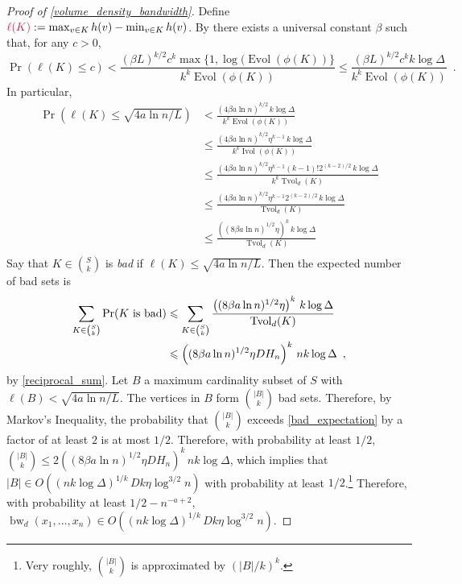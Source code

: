 \documentclass{patmorin}
\makeatletter
\renewcommand{\le}{\leqslant}
\newcommand{\david}[1]{{\color{orange} David: #1}}
\newcommand{\defin}[1]{\emph{\textcolor{brightmaroon}{#1}}}
\def\mathcolor#1#{\@mathcolor{#1}}
\def\@mathcolor#1#2#3{%
  \protect\leavevmode
  \begingroup
    \color#1{#2}#3%
  \endgroup
}
\newcommand{\mathdefin}[1]{\mathcolor{brightmaroon}{#1}}
\DeclareMathOperator{\bw}{bw}
\DeclareMathOperator{\evol}{Evol}
\DeclareMathOperator{\ivol}{Ivol}
\DeclareMathOperator{\tvol}{Tvol}
\makeatother
\begin{document}
\begin{proof}[Proof of \cref{volume_density_bandwidth}]
  Define $\mathdefin{\ell(K)}:=\max_{v\in K}h(v)-\min_{v\in K} h(v)$.  By \cite[Theorem~9]{feige:approximating} there exists a universal constant $\beta$ such that, for any $c>0$,
  \[
      \Pr(\ell(K) \le c)
        < \frac{(\beta L)^{k/2}c^k\max\{1,\log(\evol(\phi(K))\}}{k^k\evol(\phi(K))}
        \le \frac{(\beta L)^{k/2}c^kk\log\Delta}{k^k\evol(\phi(K))} \enspace .
  \]
  In particular,
  \begin{align*}
    \Pr(\ell(K) \le \sqrt{4a\ln n/L})
      & <
      \frac{(4\beta a\ln n)^{k/2}\, k\log\Delta}{k^k\evol(\phi(K))} \\
      & \le \frac{(4\beta a\ln n)^{k/2}\eta^{k-1}\, k\log\Delta}{k^k\ivol(\phi(K))} \\
      & \le \frac{(4\beta a\ln n)^{k/2}\eta^{k-1}(k-1)!2^{(k-2)/2}\, k\log\Delta}{k^k\tvol_{d}(K)} \\
      & \le \frac{(4\beta a\ln n)^{k/2}\eta^{k-1}2^{(k-2)/2}\,k\log\Delta}{\tvol_{d}(K)} \\
      & \le \frac{\left((8\beta a\ln n)^{1/2}\eta\right)^{k}\,k\log\Delta}{\tvol_{d}(K)} \\
  \end{align*}
  Say that $K\in\binom{S}{k}$ is \defin{bad} if $\ell(K) \le \sqrt{4a\ln n/L}$. Then the expected number of bad sets is
  \begin{align}
    \sum_{K\in \binom{S}{k}} \Pr(\text{$K$ is bad})
    & \le \sum_{K\in \binom{S}{k}} \frac{\left((8\beta a\ln n)^{1/2}\eta\right)^{k}\, k\log\Delta}{\tvol_{d}(K)} \notag \\
    & \le \left((8\beta a\ln n)^{1/2}\eta DH_n\right)^{k}\, nk\log\Delta
    \enspace ,
     \label{bad_expectation}
  \end{align}
  by \cref{reciprocal_sum}.
  Let $B$ a maximum cardinality subset of $S$ with $\ell(B)<\sqrt{4a\ln n/L}$.  The vertices in $B$ form $\binom{|B|}{k}$ bad sets. Therefore, by Markov's Inequality, the probability that $\binom{|B|}{k}$ exceeds \eqref{bad_expectation} by a factor of at least $2$ is at most $1/2$.  Therefore, with probability at least $1/2$, $\binom{|B|}{k}\le 2\left((8\beta a\ln n)^{1/2}\eta DH_n\right)^{k}\, nk\log\Delta$, which implies that $|B|\in O((nk\log\Delta)^{1/k}\,Dk\eta\log^{3/2} n)$ with probability at least $1/2$.\footnote{Very roughly, $\binom{|B|}{k}$ is approximated by $(|B|/k)^k$.}  Therefore, with probability at least $1/2-n^{-a+2}$, $\bw_d(x_1,\ldots,x_n)\in O((nk\log\Delta)^{1/k}\,Dk\eta\log^{3/2} n)$.
\end{proof}

\end{document}
